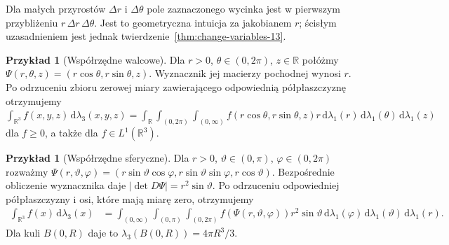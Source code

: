 \documentclass[11pt,a4paper,oneside]{book}
\numberwithin{equation}{chapter}
\theoremstyle{plain}
\theoremstyle{definition}
\newtheorem{przyklad}[twierdzenie]{Przykład}
\theoremstyle{remark}
\begin{document}
\begin{center}
\end{center}
\noindent
Dla małych przyrostów $\Delta r$ i $\Delta\theta$ pole
zaznaczonego wycinka jest w pierwszym przybliżeniu
$r\,\Delta r\,\Delta\theta$. Jest to geometryczna intuicja
za jakobianem $r$; ścisłym uzasadnieniem jest jednak
twierdzenie~\ref{thm:change-variables-13}.

\begin{przyklad}[Współrzędne walcowe]
Dla $r>0$, $\theta\in(0,2\pi)$, $z\in\mathbb R$
połóżmy $\Psi(r,\theta,z)=(r\cos\theta,r\sin\theta,z)$.
Wyznacznik jej macierzy pochodnej wynosi $r$.
Po odrzuceniu zbioru zerowej miary zawierającego
odpowiednią półpłaszczyznę otrzymujemy
$\int_{\mathbb R^3}f(x,y,z)\,\mathrm d\lambda_3(x,y,z)
=\int_{\mathbb R}\int_{(0,2\pi)}\int_{(0,\infty)}
 f(r\cos\theta,r\sin\theta,z)r\,
\mathrm d\lambda_1(r)\,\mathrm d\lambda_1(\theta)
\,\mathrm d\lambda_1(z)$
dla $f\ge0$, a także dla $f\in L^1(\mathbb R^3)$.
\end{przyklad}

\begin{przyklad}[Współrzędne sferyczne]
Dla $r>0$, $\vartheta\in(0,\pi)$, $\varphi\in(0,2\pi)$
rozważmy
$\Psi(r,\vartheta,\varphi)=
(r\sin\vartheta\cos\varphi,
 r\sin\vartheta\sin\varphi,r\cos\vartheta)$.
Bezpośrednie obliczenie wyznacznika daje
$|\det D\Psi|=r^2\sin\vartheta$.
Po odrzuceniu odpowiedniej półpłaszczyzny i osi,
które mają miarę zero, otrzymujemy
\begin{align*}
\int_{\mathbb R^3}f(x)\,\mathrm d\lambda_3(x)
&=\int_{(0,\infty)}\int_{(0,\pi)}\int_{(0,2\pi)}
 f(\Psi(r,\vartheta,\varphi))r^2\sin\vartheta\,
 \mathrm d\lambda_1(\varphi)\,\mathrm d\lambda_1(\vartheta)
 \,\mathrm d\lambda_1(r).
\end{align*}
Dla kuli $B(0,R)$ daje to $\lambda_3(B(0,R))=4\pi R^3/3$.
\end{przyklad}
\end{document}
